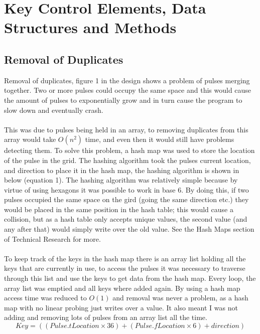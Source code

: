 \documentclass[10pt,a4paper]{article}
\begin{document}
\section{Key Control Elements, Data Structures and Methods}
\subsection{Removal of Duplicates}
Removal of duplicates, figure 1 in the design shows a problem of pulses merging together. Two or more pulses could occupy the same space and this would cause the amount of pulses to exponentially grow and in turn cause the program to slow down and eventually crash.\\
\\
This was due to pulses being held in an array, to removing duplicates from this array would take $ O(n^{2}) $ time, and even then it would still have problems detecting them. To solve this problem, a hash map was used to store the location of the pulse in the grid. The hashing algorithm took the pulses current location, and direction to place it in the hash map, the hashing algorithm is shown in below (equation 1). The hashing algorithm was relatively simple because by virtue of using hexagons it was possible to work in base 6. By doing this, if two pulses occupied the same space on the gird (going the same direction etc.) they would be placed in the same position in the hash table; this would cause a collision, but as a hash table only accepts unique values, the second value (and any after that) would simply write over the old value. See the Hash Maps section of Technical Research for more.\\
\\
To keep track of the keys in the hash map there is an array list holding all the keys that are currently in use, to access the pulses it was necessary to traverse through this list and use the keys to get data from the hash map. Every loop, the array list was emptied and all keys where added again. By using a hash map access time was reduced to $O(1)$ and removal was never a problem, as a hash map with no linear probing just writes over a value. It also meant I was not adding and removing lots of pulses from an array list all the time.\\
\begin{equation}
Key = ((Pulse.tLocation \times 36) + (Pulse.fLocation \times 6) + direction)
\end{equation}
\end{document}
